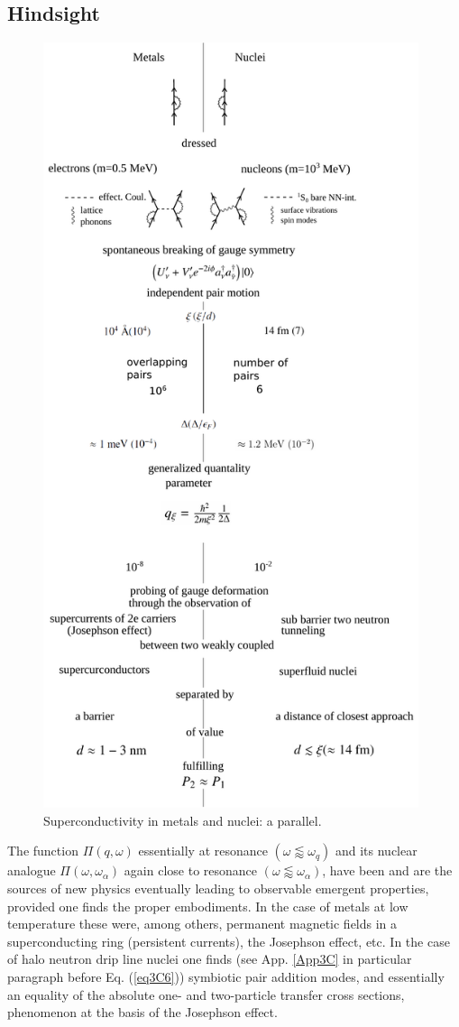\begin{subappendices}
\subsection{Hindsight}
         \begin{figure}
         	\centerline{\includegraphics*[width=11cm,angle=0	]{nutshell/figs/fig3B4x}}
         	\caption{Superconductivity in metals and nuclei: a parallel.}\label{fig3B4x}
         \end{figure}
The function $\Pi(q,\omega)$ essentially at resonance $(\omega\lessapprox\omega_q)$ and its nuclear analogue  $\Pi(\omega,\omega_\alpha)$ again close to resonance $(\omega\lessapprox\omega_\alpha)$, have been and are the sources of new physics eventually leading to observable emergent properties, provided one finds the  proper embodiments. In the case of metals at low temperature these were, among others, permanent magnetic fields in a superconducting ring (persistent currents), the Josephson effect, etc. In the case of halo neutron drip line nuclei one finds (see App. \ref{App3C} in particular paragraph before Eq. (\ref{eq3C6})) symbiotic pair addition modes,  and  essentially an equality of the absolute one- and two-particle transfer cross sections, phenomenon at the basis of the Josephson effect. 

\end{subappendices}
